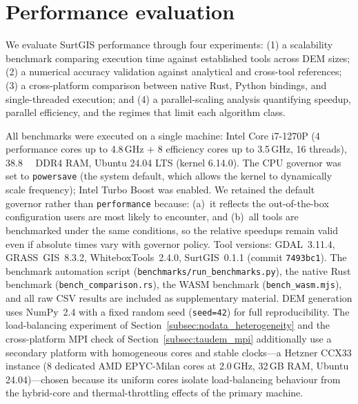 \documentclass[preprint,review,12pt,authoryear]{elsarticle}
\newif\ifmarkedrev
\newcommand{\revtext}[1]{\ifmarkedrev\textcolor{blue}{#1}\else#1\fi}
\begin{document}
\section{Performance evaluation}
\label{sec:performance}

We evaluate SurtGIS performance through four experiments: (1) a scalability benchmark comparing execution time against established tools across DEM sizes; (2) a numerical accuracy validation against analytical and cross-tool references; (3) a cross-platform comparison between native Rust, Python bindings, and single-threaded execution; and (4) a parallel-scaling analysis quantifying speedup, parallel efficiency, and the regimes that limit each algorithm class.

All benchmarks were executed on a single machine: Intel Core i7-1270P (4 performance cores up to 4.8\,GHz + 8 efficiency cores up to 3.5\,GHz, 16 threads), \SI{38.8}{\giga\byte} DDR4 RAM, Ubuntu 24.04 LTS (kernel 6.14.0). The CPU governor was set to \texttt{powersave} (the system default, which allows the kernel to dynamically scale frequency); Intel Turbo Boost was enabled. We retained the default governor rather than \texttt{performance} because: (a)~it reflects the out-of-the-box configuration users are most likely to encounter, and (b)~all tools are benchmarked under the same conditions, so the relative speedups remain valid even if absolute times vary with governor policy. Tool versions: GDAL~3.11.4, GRASS~GIS~8.3.2, WhiteboxTools~2.4.0, SurtGIS~0.1.1 (commit \texttt{7493bc1}). The benchmark automation script (\texttt{benchmarks/run\_benchmarks.py}), the native Rust benchmark (\texttt{bench\_comparison.rs}), the WASM benchmark (\texttt{bench\_wasm.mjs}), and all raw CSV results are included as supplementary material. DEM generation uses NumPy~2.4 with a fixed random seed (\texttt{seed=42}) for full reproducibility. \revtext{The load-balancing experiment of Section~\ref{subsec:nodata_heterogeneity} and the cross-platform MPI check of Section~\ref{subsec:taudem_mpi} additionally use a secondary platform with homogeneous cores and stable clocks---a Hetzner CCX33 instance (8 dedicated AMD EPYC-Milan cores at 2.0\,GHz, 32\,GB RAM, Ubuntu 24.04)---chosen because its uniform cores isolate load-balancing behaviour from the hybrid-core and thermal-throttling effects of the primary machine.}
\end{document}
